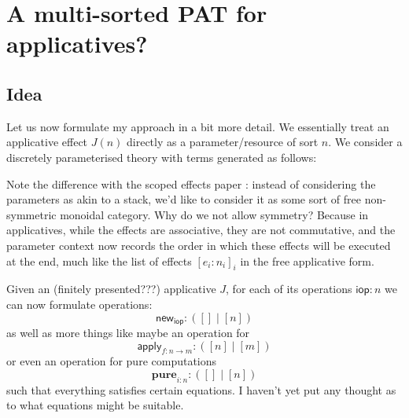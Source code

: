 \documentclass{article}
\theoremstyle{definition}
\theoremstyle{remark}
\newcommand{\ipure}{\mathbf{pure}}
\newcommand{\opnew}{\mathsf{new}}
\newcommand{\opapply}{\mathsf{apply}}
\newcommand{\idiomop}{\mathsf{iop}}
\begin{document}
\section{A multi-sorted PAT for applicatives?}

\subsection{Idea}

Let us now formulate my approach in a bit more detail. We essentially treat an applicative effect $J(n)$ directly as a parameter/resource of sort $n$. We consider a discretely parameterised theory with terms generated as follows:

Note the difference with the scoped effects paper \cite{lindley-scoped-effects, matache-scoped-effects}: instead of considering the parameters as akin to a stack, we'd like to consider it as some sort of free non-symmetric monoidal category. Why do we not allow symmetry? Because in applicatives, while the effects are associative, they are not commutative, and the parameter context now records the order in which these effects will be executed at the end, much like the list of effects $[e_i:n_i]_i$ in the free applicative form. 


Given an (finitely presented???) applicative $J$, for each of its operations $\idiomop: n$ we can now formulate operations:
\[
  \opnew_{\idiomop}: ([] \mid [n])
\]
as well as more things like maybe an operation for 
\[
  \opapply_{f: n \to m}: ([n] \mid [m])
\]
or even an operation for pure computations 
\[
  \ipure_{i: n}: ([] \mid [n])
\]
such that everything satisfies certain equations. I haven't yet put any thought as to what equations might be suitable. 
\end{document}
